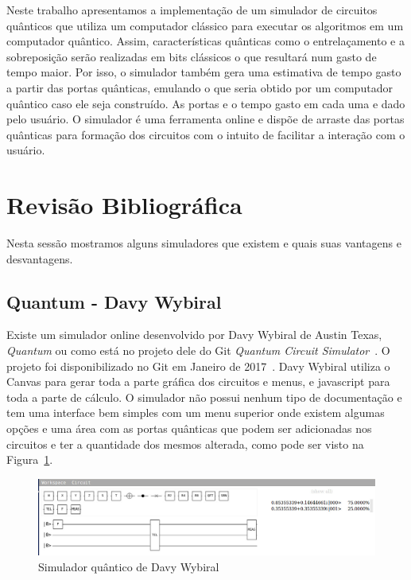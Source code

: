 \documentclass[a4paper, 12pt, oneside]{book}
\begin{document}
Neste trabalho apresentamos a implementação de um simulador de circuitos quânticos que utiliza um computador clássico para executar os algoritmos em um computador quântico. Assim, características quânticas como o entrelaçamento e a sobreposição serão realizadas em bits clássicos o que resultará num gasto de tempo maior. Por isso, o simulador também gera uma estimativa de tempo gasto a partir das portas quânticas, emulando o que seria obtido por um computador quântico caso ele seja construído. As portas e o tempo gasto em cada uma e dado pelo usuário. O simulador é uma ferramenta online e dispõe de arraste das portas quânticas para formação dos circuitos com o intuito de facilitar a interação com o usuário.

\section{Revisão Bibliográfica}

Nesta sessão mostramos alguns simuladores que existem e quais suas vantagens e desvantagens.

\subsection{Quantum - Davy Wybiral}

Existe um simulador online desenvolvido por Davy Wybiral de Austin Texas, \textit{Quantum} ou como está no projeto dele do Git \textit{Quantum Circuit Simulator}~\cite{davyw}. O projeto foi disponibilizado no Git em Janeiro de 2017~\cite{gitdavyw}. Davy Wybiral utiliza o Canvas para gerar toda a parte gráfica dos circuitos e menus, e javascript para toda a parte de cálculo. O simulador não possui nenhum tipo de documentação e tem uma interface bem simples com um menu superior onde existem algumas opções e uma área com as portas quânticas que podem ser adicionadas nos circuitos e ter a quantidade dos mesmos alterada, como pode ser visto na Figura~\ref{fig:davyw}.

\begin{figure}[hbtp]
\centering
\includegraphics[scale=0.36]{davyw.jpg}
\caption{Simulador quântico de Davy Wybiral}
\label{fig:davyw}
\end{figure}
\end{document}
